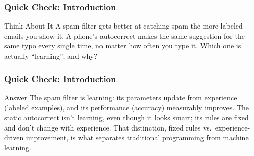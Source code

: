 





\begin{frame}[fragile]\frametitle{Quick Check: Introduction}
\begin{block}{Think About It}
A spam filter gets better at catching spam the more labeled emails you show it. A phone's autocorrect makes the same suggestion for the same typo every single time, no matter how often you type it. Which one is actually ``learning'', and why?
\end{block}
\end{frame}

\begin{frame}[fragile]\frametitle{Quick Check: Introduction}
\begin{block}{Answer}
The spam filter is learning: its parameters update from experience (labeled examples), and its performance (accuracy) measurably improves. The static autocorrect isn't learning, even though it looks smart; its rules are fixed and don't change with experience. That distinction, fixed rules vs.\ experience-driven improvement, is what separates traditional programming from machine learning.
\end{block}
\end{frame}

